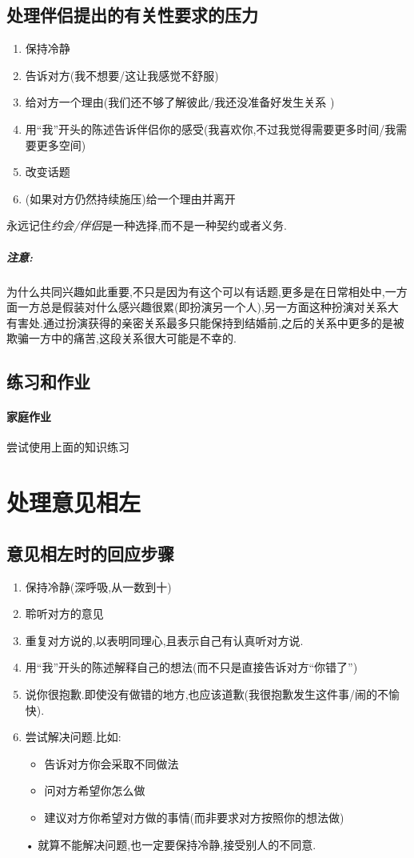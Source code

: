 \documentclass[UTF8]{article}
\newcommand{\Exer}{\subsection{练习和作业}}
\newcommand{\exer}{\paragraph*{家庭作业}}
\newcommand{\warn}{\subparagraph*{注意:}}
\newcommand{\Dot}{•}
\begin{document}
\subsection{处理伴侣提出的有关性要求的压力}
\begin{enumerate}
    \item 保持冷静
    \item 告诉对方(我不想要/这让我感觉不舒服)
    \item 给对方一个理由(我们还不够了解彼此/我还没准备好发生关系 )
    \item 用``我''开头的陈述告诉伴侣你的感受(我喜欢你,不过我觉得需要更多时间/我需要更多空间)
    \item 改变话题
    \item (如果对方仍然持续施压)给一个理由并离开
\end{enumerate}
永远记住\emph{约会/伴侣}是一种选择,而不是一种契约或者义务.
\warn 为什么共同兴趣如此重要,不只是因为有这个可以有话题,更多是在日常相处中,一方面一方总是假装对什么感兴趣很累(即扮演另一个人),另一方面这种扮演对关系大有害处.通过扮演获得的亲密关系最多只能保持到结婚前,之后的关系中更多的是被欺骗一方中的痛苦,这段关系很大可能是不幸的.

\Exer \exer 尝试使用上面的知识练习

\newpage
\section{处理意见相左}

\subsection{意见相左时的回应步骤}
\begin{enumerate}
    \item 保持冷静(深呼吸,从一数到十)
    \item 聆听对方的意见
    \item 重复对方说的,以表明同理心,且表示自己有认真听对方说.
    \item 用``我''开头的陈述解释自己的想法(而不只是直接告诉对方``你错了'')
    \item 说你很抱歉.即使没有做错的地方,也应该道歉(我很抱歉发生这件事/闹的不愉快).
    \item 尝试解决问题.比如:\begin{itemize}
        \item 告诉对方你会采取不同做法
        \item 问对方希望你怎么做
        \item 建议对方你希望对方做的事情(而非要求对方按照你的想法做)
    \end{itemize}
    \item[\Dot] 就算不能解决问题,也一定要保持冷静,接受别人的不同意.
\end{enumerate}
\end{document}
